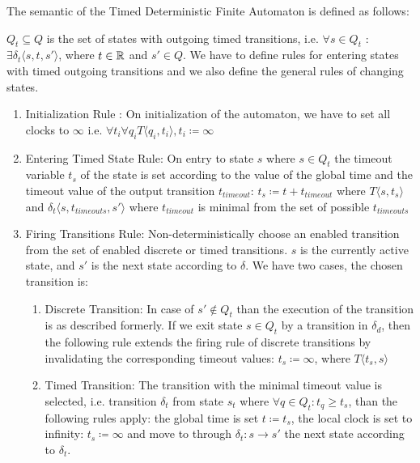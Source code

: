 				The semantic of the Timed Deterministic Finite Automaton is defined as follows:
				
				
				
				$Q_t \subseteq Q$ is the set of states with outgoing timed transitions, 
				i.e. $\forall s \in Q_t$ : $ \exists \delta_t\langle s, t, s' \rangle$, where $t \in \mathbb{R}$ and $s' \in Q$.
				We have to define rules for entering states with timed outgoing transitions and we also define the general rules of changing states. 
				
				\begin{enumerate}
					\item Initialization Rule : On initialization of the automaton, we have to set all clocks to $\infty$ 
					i.e. $\forall t_i \forall q_i T \langle q_i, t_i \rangle, t_i \coloneqq \infty $
					
					\item Entering Timed State Rule: On entry to state $s$ where $s \in Q_t$ the timeout variable $t_s$ of the state is set according to the value of the global time and the timeout value of the output transition $t_{timeout}$:
						$t_s\coloneqq t+t_{timeout}$
						where $T\langle s,t_s \rangle$ and $\delta_t\langle s,t_{timeouts},s' \rangle$ where $t_{timeout}$ is minimal from the set of possible $t_{timeouts}$ 
					
					\item Firing Transitions Rule: Non-deterministically choose an enabled transition from the set of enabled discrete or timed transitions. 
						$s$ is the currently active state, and $s'$ is the next state according to $\delta$.
						We have two cases, the chosen transition is:
						\begin{enumerate}
							\item Discrete Transition: In case of $s' \notin Q_t$ than the execution of the transition is as described formerly. 
							If we exit state $s \in Q_t$ by a transition in $\delta_d$, 
							then the following rule extends the firing rule of discrete transitions by invalidating the corresponding timeout values:
								$t_s \coloneqq \infty$, where $T \langle t_s, s \rangle$
							\item Timed Transition: The transition with the minimal timeout value is selected, 
								i.e. transition $\delta_t$ from state $s_t$ where $\forall q \in Q_t: t_q \geq t_s$, than the following rules apply:
								the global time is set $t \coloneqq t_s$, the local clock is set to infinity: 
								$t_s \coloneqq \infty$ and move to through $\delta_t : s \rightarrow s'$ the next state according to $\delta_t$.
						\end{enumerate}			
				\end{enumerate}
			
